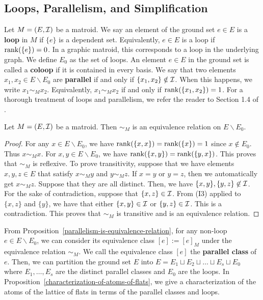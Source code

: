 \documentclass{puthesis-UG}
\begin{document}
\subsection{Loops, Parallelism, and Simplification} \label{sec:loops-parallel-simple}

Let $M = (E, \mathcal{I})$ be a matroid. We say an element of the ground set $e \in E$ is a \textbf{loop} in $M$ if $\{e\}$ is a dependent set. Equivalently, $e \in E$ is a loop if $\operatorname{rank} (\{e\}) = 0$. In a graphic matroid, this corresponds to a loop in the underlying graph. We define $E_0$ as the set of loops. An element $e \in E$ in the ground set is called a \textbf{coloop} if it is contained in every basis. We say that two elements $x_1, x_2 \in E \backslash E_0$ are \textbf{parallel} if and only if $\{x_1, x_2\} \notin \mathcal{I}$. When this happens, we write $x_1 \sim_M x_2$. Equivalently, $x_1 \sim_M x_2$ if and only if $\operatorname{rank} (\{x_1, x_2\}) = 1$. For a thorough treatment of loops and parallelism, we refer the reader to Section 1.4 of \cite{welsh}.

\begin{prop} \label{parallelism-is-equivalence-relation}
	Let $M = (E, \mathcal{I})$ be a matroid. Then $\sim_M$ is an equivalence relation on $E \backslash E_0$. 
\end{prop}

\begin{proof}
	For any $x \in E \backslash E_0$, we have $\operatorname{rank} (\{x, x\}) = \operatorname{rank} (\{x\}) = 1$ since $x \notin E_0$. Thus $x \sim_M x$. For $x, y \in E \backslash E_0$, we have $\operatorname{rank} (\{x, y\}) = \operatorname{rank} (\{y, x\})$. This proves that $\sim_M$ is reflexive. To prove transitivity, suppose that we have elements $x, y, z \in E$ that satisfy $x \sim_M y$ and $y \sim_M z$. If $x = y$ or $y = z$, then we automatically get $x \sim_M z$. Suppose that they are all distinct. Then, we have $\{x, y\}, \{y, z\} \not\in \mathcal{I}$. For the sake of contradiction, suppose that $\{x, z\} \in \mathcal{I}$. From (I3) applied to $\{x, z\}$ and $\{y\}$, we have that either $\{x, y\} \in \mathcal{I}$ or $\{y, z\} \in \mathcal{I}$. This is a contradiction. This proves that $\sim_M$ is transitive and is an equivalence relation. 
\end{proof}

From Proposition~\ref{parallelism-is-equivalence-relation}, for any non-loop $e \in E \backslash E_0$, we can consider its equivalence class $[e] := [e]_M$ under the equivalence relation $\sim_M$. We call the equivalence class $[e]$ the \textbf{parallel class} of $e$. Then, we can partition the ground set $E$ into $E = E_1 \sqcup E_2 \sqcup \ldots \sqcup E_s \sqcup E_0$ where $E_1, \ldots, E_s$ are the distinct parallel classes and $E_0$ are the loops. In Proposition~\ref{characterization-of-atoms-of-flats}, we give a characterization of the atoms of the lattice of flats in terms of the parallel classes and loops. 
\end{document}
